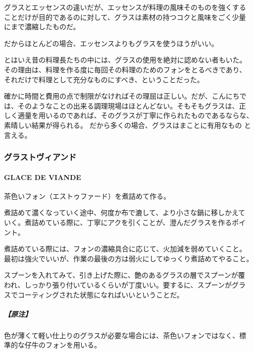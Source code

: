 \documentclass[twoside,12Q,b5j]{escoffierltjsbook}
\newenvironment{recette}{\begin{small}\begin{spacing}{1}\begin{multicols}{2}}{\end{multicols}\end{spacing}\end{small}}
\begin{document}
\begin{recette}
グラスとエッセンスの違いだが、エッセンスが料理の風味そのものを強くする
ことだけが目的であるのに対して、グラスは素材の持つコクと風味をごく少量
にまで濃縮したものだ。

だからほとんどの場合、エッセンスよりもグラスを使うほうがいい。

とはいえ昔の料理長たちの中には、グラスの使用を絶対に認めない者もいた。
その理由は、料理を作る度に毎回その料理のためのフォンをとるべきであり、
それだけで料理として充分なものにすべき、ということだった。

確かに時間と費用の点で制限がなければその理屈は正しい。だが、こんにちで
は、そのようなことの出来る調理現場はほとんどない。そもそもグラスは、正
しく適量を用いるのであれば、そのグラスが丁寧に作られたものであるならな、
素晴しい結果が得られる。 だから多くの場合、グラスはまことに有用なもの
と言える。

\vspace*{1.7\zw}

\subsubsection{グラストヴィアンド}\label{ux30b0ux30e9ux30b9ux30c8ux30f4ux30a3ux30a2ux30f3ux30c9}

\paragraph{GLACE DE VIANDE}\label{glace-de-viande}


茶色いフォン（エストゥファード）を煮詰めて作る。

煮詰めて濃くなっていく途中、何度か布で漉して、より小さな鍋に移しかえて
いく。煮詰めている際に、丁寧にアクを引くことが、澄んだグラスを作るポイ
ント。

煮詰めている際には、フォンの濃縮具合に応じて、火加減を弱めていくこと。
最初は強火でいいが、作業の最後の方は弱火にしてゆっくり煮詰めてやること。

スプーンを入れてみて、引き上げた際に、艶のあるグラスの層でスプーンが覆
われ、しっかり張り付いているくらいが丁度いい。要するに、スプーンがグラ
スでコーティングされた状態になればいいということだ。

\subparagraph{【原注】}\label{ux539fux6ce8-5}

色が薄くて軽い仕上りのグラスが必要な場合には、茶色いフォンではなく、標
準的な仔牛のフォンを用いる。


\end{recette}
\end{document}
